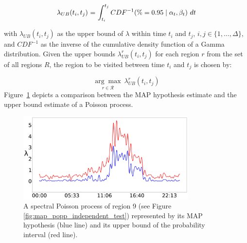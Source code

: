 \begin{equation}
	\label{eq:upper_bound_exploration}
	\begin{tabular}{r@{ = }l}
	$\lambda_{UB}(t_i, t_j)$ & $\displaystyle \int_{t_i}^{t_j} CDF^{-1}(\% = 0.95 \mid \alpha_t, \beta_t)~dt$\\ [1ex]
	\end{tabular}
\end{equation}

\noindent with $\lambda_{UB}(t_i, t_j)$ as the upper bound of $\lambda$ within time $t_i$ and $t_j$, $i, j \in \{1, \ldots, \Delta\}$, and $CDF^{-1}$ as the inverse of the cumulative density function of a Gamma distribution. Given the upper bounds $\lambda^{r}_{UB}(t_i, t_j)$ for each region $r$ from the set of all regions $R$, the region to be visited between time $t_i$ and $t_j$ is chosen by:

\begin{equation}
\label{eq:choosing_place}
\underset{r \in \mathcal R}{\arg\max}~\lambda^{r}_{UB}(t_i, t_j)
\end{equation}
\noindent Figure~\ref{fig:map_vs_ub} depicts a comparison between the MAP hypothesis estimate and the upper bound estimate of a Poisson process.

\begin{figure}[t!]
	\centering
	\includegraphics[width=0.8\textwidth]{./figures/map_vs_ub.png}
	\caption{A spectral Poisson process of region 9 (see Figure \ref{fig:map_popp_independent_test}) represented by its MAP hypothesis (blue line) and its upper bound of the probability interval (red line).}
	\label{fig:map_vs_ub}
	\vspace{-25pt}
\end{figure}

